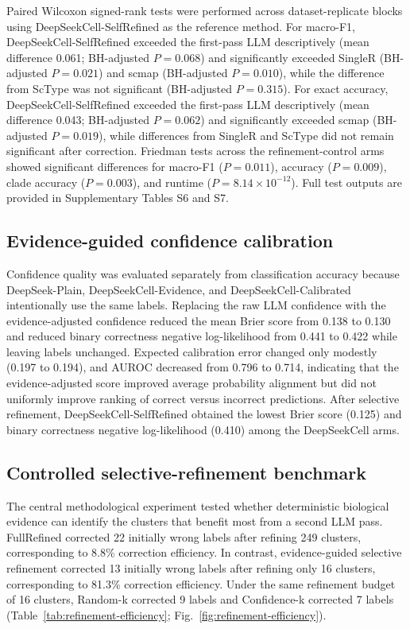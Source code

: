 \documentclass[referee,lineno,pdflatex]{sn-jnl}
\begin{document}
Paired Wilcoxon signed-rank tests were performed across dataset-replicate blocks using DeepSeekCell-SelfRefined as the reference method. For macro-F1, DeepSeekCell-SelfRefined exceeded the first-pass LLM descriptively (mean difference 0.061; BH-adjusted \(P=0.068\)) and significantly exceeded SingleR (BH-adjusted \(P=0.021\)) and scmap (BH-adjusted \(P=0.010\)), while the difference from ScType was not significant (BH-adjusted \(P=0.315\)). For exact accuracy, DeepSeekCell-SelfRefined exceeded the first-pass LLM descriptively (mean difference 0.043; BH-adjusted \(P=0.062\)) and significantly exceeded scmap (BH-adjusted \(P=0.019\)), while differences from SingleR and ScType did not remain significant after correction. Friedman tests across the refinement-control arms showed significant differences for macro-F1 (\(P=0.011\)), accuracy (\(P=0.009\)), clade accuracy (\(P=0.003\)), and runtime (\(P=8.14\times10^{-12}\)). Full test outputs are provided in Supplementary Tables S6 and S7.

\subsection{Evidence-guided confidence calibration}

Confidence quality was evaluated separately from classification accuracy because DeepSeek-Plain, DeepSeekCell-Evidence, and DeepSeekCell-Calibrated intentionally use the same labels. Replacing the raw LLM confidence with the evidence-adjusted confidence reduced the mean Brier score from 0.138 to 0.130 and reduced binary correctness negative log-likelihood from 0.441 to 0.422 while leaving labels unchanged. Expected calibration error changed only modestly (0.197 to 0.194), and AUROC decreased from 0.796 to 0.714, indicating that the evidence-adjusted score improved average probability alignment but did not uniformly improve ranking of correct versus incorrect predictions. After selective refinement, DeepSeekCell-SelfRefined obtained the lowest Brier score (0.125) and binary correctness negative log-likelihood (0.410) among the DeepSeekCell arms.

\subsection{Controlled selective-refinement benchmark}

The central methodological experiment tested whether deterministic biological evidence can identify the clusters that benefit most from a second LLM pass. FullRefined corrected 22 initially wrong labels after refining 249 clusters, corresponding to 8.8\% correction efficiency. In contrast, evidence-guided selective refinement corrected 13 initially wrong labels after refining only 16 clusters, corresponding to 81.3\% correction efficiency. Under the same refinement budget of 16 clusters, Random-k corrected 9 labels and Confidence-k corrected 7 labels (Table~\ref{tab:refinement-efficiency}; Fig.~\ref{fig:refinement-efficiency}).
\end{document}
